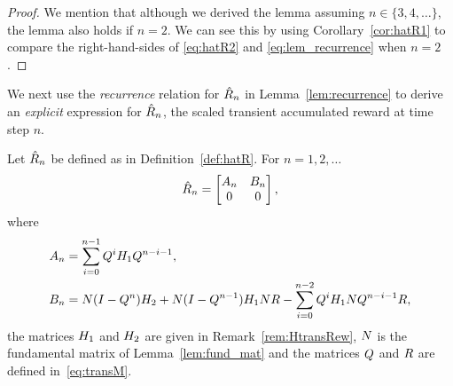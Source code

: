 \begin{proof}
We mention that although we derived the lemma assuming $n \in \{3, 4, \ldots\}$, the lemma also holds if $n=2$.  We can see this by using  Corollary~\ref{cor:hatR1} to compare the right-hand-sides of \eqref{eq:hatR2} and \eqref{eq:lem_recurrence} when $n=2$.

\end{proof}

We next use the \emph{recurrence} relation for $\hat{R}_{n}$ in Lemma~\ref{lem:recurrence} to derive an \emph{explicit} expression for $\hat{R}_{n}$, the scaled transient accumulated reward at time step $n$.

\begin{myLemma}
	\label{lem:hatRn_matrix}
	Let $\hat{R}_{n}$ be defined as in Definition~\ref{def:hatR}.
	For $n = 1, 2, \ldots $
	\begin{equation}
	\label{eq:hatRn_matrix}
		\hat{R}_{n} = 
		\begin{bmatrix}
			A_{n} & B_{n}\\
			0 & 0 
		\end{bmatrix},
	\end{equation}	
	where
	\begin{align}
		\label{eq:RewSubDn}
			A_{n} &= \sum_{i = 0}^{n-1}Q^{i}H_{1}Q^{n - i - 1}, \\
		\label{eq:RewSubCn}
			B_{n} &= N(I - Q^{n})H_{2} + N(I - Q^{n-1})H_{1}NR - \sum_{i = 0}^{n-2}Q^{i}H_{1}NQ^{n - i - 1}R,
	\end{align}
	the matrices $H_{1}$ and $H_{2}$ are given in Remark~\ref{rem:HtransRew}, $N$ is the fundamental matrix of Lemma~\ref{lem:fund_mat} and the matrices $Q$ and $R$ are defined in~\eqref{eq:transM}.
\end{myLemma}

